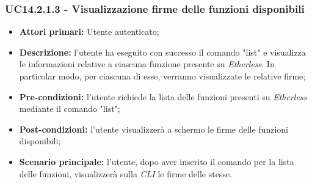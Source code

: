\subsubsection{UC14.2.1.3 - Visualizzazione firme delle funzioni disponibili}
\begin{itemize}
	\item \textbf{Attori primari:} Utente autenticato;
	\item \textbf{Descrizione:} l'utente ha eseguito con successo il comando "list" e visualizza le informazioni relative a ciascuna funzione presente su \textit{Etherless}. In particolar modo, per ciascuna di esse, verranno visualizzate le relative firme;
	\item \textbf{Pre-condizioni:} l'utente richiede la lista delle funzioni presenti su \textit{Etherless} mediante il comando "list";
	\item \textbf{Post-condizioni:} l'utente visualizzerà a schermo le firme delle funzioni disponibili;
	\item \textbf{Scenario principale:} l'utente, dopo aver inserito il comando per la lista delle funzioni, visualizzerà sulla \textit{CLI\glo} le firme delle stesse.
\end{itemize}
